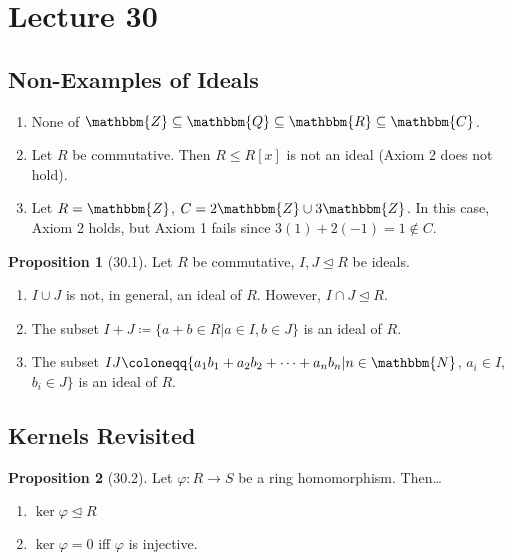 \documentclass{article}
\newcommand{\N}{\mathbbm{N}}
\newcommand{\Z}{\mathbbm{Z}}
\newcommand{\Q}{\mathbbm{Q}}
\newcommand{\R}{\mathbbm{R}}
\newcommand{\C}{\mathbbm{C}}
\newcommand{\union}{\cup}
\newcommand{\inter}{\cap}
\newcommand{\coleq}{\coloneqq}
\newcommand{\func}[3]{#1: #2 \to #3}
\renewcommand{\Subset}{\subseteq}
\theoremstyle{definition}
\newtheorem*{prop}{Proposition}
\theoremstyle{remark}
\newcommand{\ideal}{\unlhd}
\begin{document}
    \section*{Lecture 30}{
        \subsection*{Non-Examples of Ideals}{
            \begin{enumerate}
                \item None of $\Z \Subset \Q \Subset \R \Subset \C$.
                \item Let $R$ be commutative. Then $R \leq R[x]$ is not an ideal (Axiom 2 does not hold).
                \item Let $R=\Z$, $C=2\Z\union 3\Z$. In this case, Axiom 2 holds, but Axiom 1 fails since $3(1)+2(-1)=1\notin C$.
            \end{enumerate}
        
        \begin{prop}[30.1]
            Let $R$ be commutative, $I,J \ideal R$ be ideals.
            \begin{enumerate}
                \item $I\union J$ is not, in general, an ideal of $R$. However, $I\inter J \ideal R$.
                \item The subset $I+J \coleq \{a+b \in R|a \in I, b \in J\}$ is an ideal of $R$.
                \item The subset $IJ \coleq \{a_1b_1+a_2b_2+\cdots+a_nb_n|n\in \N$, $a_i \in I$, $b_i \in J\}$ is an ideal of $R$.
            \end{enumerate}
        \end{prop}
        }
        \subsection*{Kernels Revisited}{
            \begin{prop}[30.2]
                Let $\func{\varphi}{R}{S}$ be a ring homomorphism. Then\ldots
                \begin{enumerate}
                    \item $\ker\varphi \ideal R$
                    \item $\ker\varphi=0$ iff $\varphi$ is injective.
                \end{enumerate}
            \end{prop}
            
}}
\end{document}
